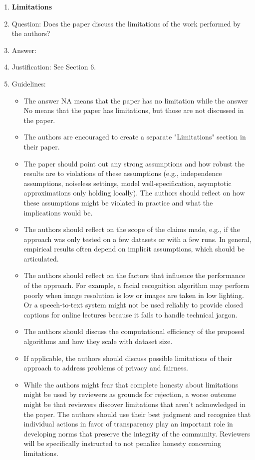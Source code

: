 \documentclass{article}
\theoremstyle{plain}
\theoremstyle{definition}
\theoremstyle{remark}
\begin{document}
\begin{enumerate}
\item {\bf Limitations}
    \item[] Question: Does the paper discuss the limitations of the work performed by the authors?
    \item[] Answer: \answerYes{} %
    \item[] Justification: See Section 6.
    \item[] Guidelines:
    \begin{itemize}
        \item The answer NA means that the paper has no limitation while the answer No means that the paper has limitations, but those are not discussed in the paper. 
        \item The authors are encouraged to create a separate "Limitations" section in their paper.
        \item The paper should point out any strong assumptions and how robust the results are to violations of these assumptions (e.g., independence assumptions, noiseless settings, model well-specification, asymptotic approximations only holding locally). The authors should reflect on how these assumptions might be violated in practice and what the implications would be.
        \item The authors should reflect on the scope of the claims made, e.g., if the approach was only tested on a few datasets or with a few runs. In general, empirical results often depend on implicit assumptions, which should be articulated.
        \item The authors should reflect on the factors that influence the performance of the approach. For example, a facial recognition algorithm may perform poorly when image resolution is low or images are taken in low lighting. Or a speech-to-text system might not be used reliably to provide closed captions for online lectures because it fails to handle technical jargon.
        \item The authors should discuss the computational efficiency of the proposed algorithms and how they scale with dataset size.
        \item If applicable, the authors should discuss possible limitations of their approach to address problems of privacy and fairness.
        \item While the authors might fear that complete honesty about limitations might be used by reviewers as grounds for rejection, a worse outcome might be that reviewers discover limitations that aren't acknowledged in the paper. The authors should use their best judgment and recognize that individual actions in favor of transparency play an important role in developing norms that preserve the integrity of the community. Reviewers will be specifically instructed to not penalize honesty concerning limitations.
    \end{itemize}


\end{enumerate}
\end{document}

